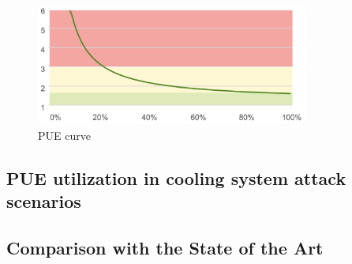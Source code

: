 \begin{figure}[h]
    \centering
    \includegraphics[width=0.8\textwidth]{chapters/images/pue_curve.png}
    \caption{PUE curve}
    \label{fig:pue_curve}
\end{figure}

\subsection{PUE utilization in cooling system attack scenarios}

\subsection{Comparison with the State of the Art}

